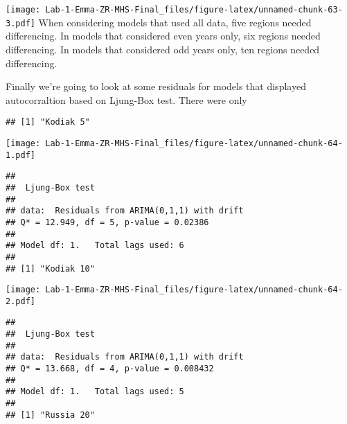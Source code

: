 \documentclass[
]{article}
\newenvironment{Shaded}{\begin{snugshade}}{\end{snugshade}}
\newcommand{\CommentTok}[1]{\textcolor[rgb]{0.56,0.35,0.01}{\textit{#1}}}
\newcommand{\ControlFlowTok}[1]{\textcolor[rgb]{0.13,0.29,0.53}{\textbf{#1}}}
\newcommand{\DecValTok}[1]{\textcolor[rgb]{0.00,0.00,0.81}{#1}}
\newcommand{\FunctionTok}[1]{\textcolor[rgb]{0.00,0.00,0.00}{#1}}
\newcommand{\NormalTok}[1]{#1}
\newcommand{\OtherTok}[1]{\textcolor[rgb]{0.56,0.35,0.01}{#1}}
\newcommand{\SpecialCharTok}[1]{\textcolor[rgb]{0.00,0.00,0.00}{#1}}
\begin{document}
\texttt{[image: Lab-1-Emma-ZR-MHS-Final\_files/figure-latex/unnamed-chunk-63-3.pdf]}
When considering models that used all data, five regions needed
differencing. In models that considered even years only, six regions
needed differencing. In models that considered odd years only, ten
regions needed differencing.

Finally we're going to look at some residuals for models that displayed
autocorraltion based on Ljung-Box test. There were only

\begin{Shaded}
\end{Shaded}

\begin{verbatim}
## [1] "Kodiak 5"
\end{verbatim}

\texttt{[image: Lab-1-Emma-ZR-MHS-Final\_files/figure-latex/unnamed-chunk-64-1.pdf]}

\begin{verbatim}
## 
##  Ljung-Box test
## 
## data:  Residuals from ARIMA(0,1,1) with drift
## Q* = 12.949, df = 5, p-value = 0.02386
## 
## Model df: 1.   Total lags used: 6
## 
## [1] "Kodiak 10"
\end{verbatim}

\texttt{[image: Lab-1-Emma-ZR-MHS-Final\_files/figure-latex/unnamed-chunk-64-2.pdf]}

\begin{verbatim}
## 
##  Ljung-Box test
## 
## data:  Residuals from ARIMA(0,1,1) with drift
## Q* = 13.668, df = 4, p-value = 0.008432
## 
## Model df: 1.   Total lags used: 5
## 
## [1] "Russia 20"
\end{verbatim}
\end{document}
